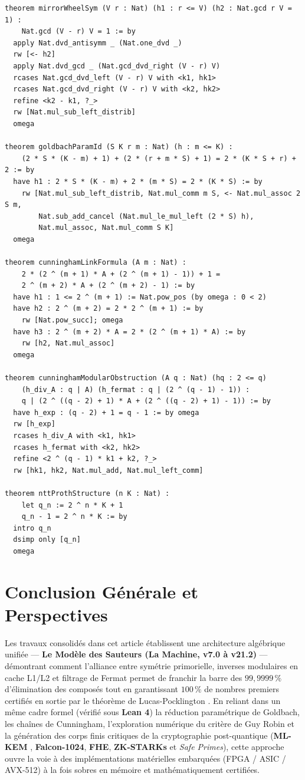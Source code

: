 \documentclass[11pt,a4paper]{article}
\begin{document}
\begin{lstlisting}[caption={Cinq théorèmes formels vérifiés mécaniquement sous Lean 4.}]
theorem mirrorWheelSym (V r : Nat) (h1 : r <= V) (h2 : Nat.gcd r V = 1) :
    Nat.gcd (V - r) V = 1 := by
  apply Nat.dvd_antisymm _ (Nat.one_dvd _)
  rw [<- h2]
  apply Nat.dvd_gcd _ (Nat.gcd_dvd_right (V - r) V)
  rcases Nat.gcd_dvd_left (V - r) V with <k1, hk1>
  rcases Nat.gcd_dvd_right (V - r) V with <k2, hk2>
  refine <k2 - k1, ?_>
  rw [Nat.mul_sub_left_distrib]
  omega

theorem goldbachParamId (S K r m : Nat) (h : m <= K) :
    (2 * S * (K - m) + 1) + (2 * (r + m * S) + 1) = 2 * (K * S + r) + 2 := by
  have h1 : 2 * S * (K - m) + 2 * (m * S) = 2 * (K * S) := by
    rw [Nat.mul_sub_left_distrib, Nat.mul_comm m S, <- Nat.mul_assoc 2 S m,
        Nat.sub_add_cancel (Nat.mul_le_mul_left (2 * S) h),
        Nat.mul_assoc, Nat.mul_comm S K]
  omega

theorem cunninghamLinkFormula (A m : Nat) :
    2 * (2 ^ (m + 1) * A + (2 ^ (m + 1) - 1)) + 1 =
    2 ^ (m + 2) * A + (2 ^ (m + 2) - 1) := by
  have h1 : 1 <= 2 ^ (m + 1) := Nat.pow_pos (by omega : 0 < 2)
  have h2 : 2 ^ (m + 2) = 2 * 2 ^ (m + 1) := by
    rw [Nat.pow_succ]; omega
  have h3 : 2 ^ (m + 2) * A = 2 * (2 ^ (m + 1) * A) := by
    rw [h2, Nat.mul_assoc]
  omega

theorem cunninghamModularObstruction (A q : Nat) (hq : 2 <= q)
    (h_div_A : q | A) (h_fermat : q | (2 ^ (q - 1) - 1)) :
    q | (2 ^ ((q - 2) + 1) * A + (2 ^ ((q - 2) + 1) - 1)) := by
  have h_exp : (q - 2) + 1 = q - 1 := by omega
  rw [h_exp]
  rcases h_div_A with <k1, hk1>
  rcases h_fermat with <k2, hk2>
  refine <2 ^ (q - 1) * k1 + k2, ?_>
  rw [hk1, hk2, Nat.mul_add, Nat.mul_left_comm]

theorem nttProthStructure (n K : Nat) :
    let q_n := 2 ^ n * K + 1
    q_n - 1 = 2 ^ n * K := by
  intro q_n
  dsimp only [q_n]
  omega
\end{lstlisting}

\section{Conclusion Générale et Perspectives}

Les travaux consolidés dans cet article établissent une architecture algébrique unifiée — \textbf{Le Modèle des Sauteurs (La Machine, v7.0 à v21.2)} — démontrant comment l'alliance entre symétrie primorielle, inverses modulaires en cache L1/L2 et filtrage de Fermat permet de franchir la barre des \textbf{$99{,}9999\,\%$} d'élimination des composés tout en garantissant \textbf{$100\,\%$} de nombres premiers certifiés en sortie par le théorème de Lucas-Pocklington \cite{pocklington1914}. En reliant dans un même cadre formel (vérifié sous \textbf{Lean 4}) la réduction paramétrique de Goldbach, les chaînes de Cunningham, l'exploration numérique du critère de Guy Robin \cite{robin1984} et la génération des corps finis critiques de la cryptographie post-quantique (\textbf{ML-KEM} \cite{nist2024}, \textbf{Falcon-1024}, \textbf{FHE}, \textbf{ZK-STARKs} et \emph{Safe Primes}), cette approche ouvre la voie à des implémentations matérielles embarquées (FPGA / ASIC / AVX-512) à la fois sobres en mémoire et mathématiquement certifiées.
\end{document}
